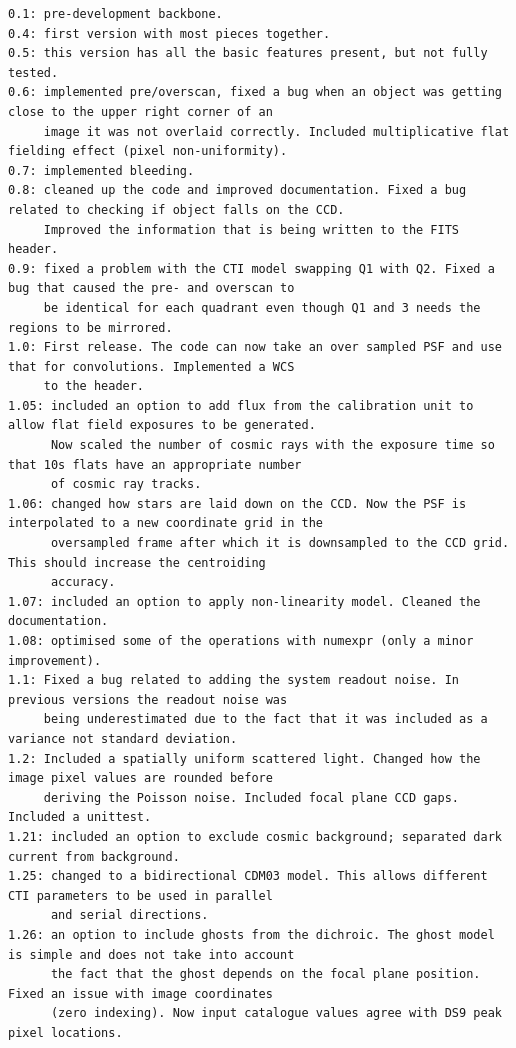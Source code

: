 \documentclass[a4paper,11pt,english]{sphinxmanual}
\begin{document}
\begin{Verbatim}[commandchars=\\\{\}]
0.1: pre-development backbone.
0.4: first version with most pieces together.
0.5: this version has all the basic features present, but not fully tested.
0.6: implemented pre/overscan, fixed a bug when an object was getting close to the upper right corner of an
     image it was not overlaid correctly. Included multiplicative flat fielding effect (pixel non-uniformity).
0.7: implemented bleeding.
0.8: cleaned up the code and improved documentation. Fixed a bug related to checking if object falls on the CCD.
     Improved the information that is being written to the FITS header.
0.9: fixed a problem with the CTI model swapping Q1 with Q2. Fixed a bug that caused the pre- and overscan to
     be identical for each quadrant even though Q1 and 3 needs the regions to be mirrored.
1.0: First release. The code can now take an over sampled PSF and use that for convolutions. Implemented a WCS
     to the header.
1.05: included an option to add flux from the calibration unit to allow flat field exposures to be generated.
      Now scaled the number of cosmic rays with the exposure time so that 10s flats have an appropriate number
      of cosmic ray tracks.
1.06: changed how stars are laid down on the CCD. Now the PSF is interpolated to a new coordinate grid in the
      oversampled frame after which it is downsampled to the CCD grid. This should increase the centroiding
      accuracy.
1.07: included an option to apply non-linearity model. Cleaned the documentation.
1.08: optimised some of the operations with numexpr (only a minor improvement).
1.1: Fixed a bug related to adding the system readout noise. In previous versions the readout noise was
     being underestimated due to the fact that it was included as a variance not standard deviation.
1.2: Included a spatially uniform scattered light. Changed how the image pixel values are rounded before
     deriving the Poisson noise. Included focal plane CCD gaps. Included a unittest.
1.21: included an option to exclude cosmic background; separated dark current from background.
1.25: changed to a bidirectional CDM03 model. This allows different CTI parameters to be used in parallel
      and serial directions.
1.26: an option to include ghosts from the dichroic. The ghost model is simple and does not take into account
      the fact that the ghost depends on the focal plane position. Fixed an issue with image coordinates
      (zero indexing). Now input catalogue values agree with DS9 peak pixel locations.

\end{Verbatim}
\end{document}
